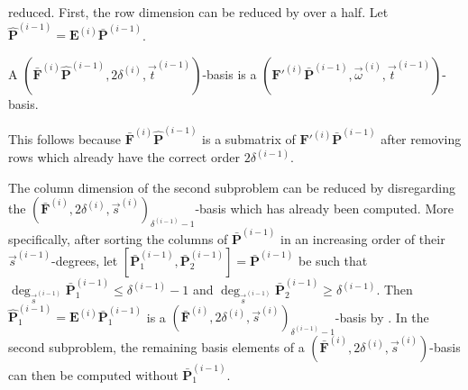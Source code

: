 reduced. First, the row dimension can be reduced by over a half. Let
$\hat{\mathbf{P}}^{\left(i-1\right)}=\mathbf{E}^{\left(i\right)}\bar{\mathbf{P}}^{\left(i-1\right)}$. 
\begin{lem}
\label{lem:simplifySecondSubproblem}A $(\bar{\mathbf{F}}^{\left(i\right)}\hat{\mathbf{P}}^{\left(i-1\right)},2\delta^{\left(i\right)},\vec{t}^{\left(i-1\right)})$-basis
is a $(\mathbf{F}'^{\left(i\right)}\bar{\mathbf{P}}^{\left(i-1\right)},\vec{\omega}^{\left(i\right)},\vec{t}^{\left(i-1\right)})$-basis.\end{lem}
\begin{pf}
This follows because 
$\bar{\mathbf{F}}^{\left(i\right)}\hat{\mathbf{P}}^{\left(i-1\right)}$
is a submatrix of 
$\mathbf{F}'^{\left(i\right)}\bar{\mathbf{P}}^{\left(i-1\right)}$
after removing rows which already have the correct order 
$2\delta^{\left(i-1\right)}$. 
\end{pf}
The column dimension of the second subproblem can be reduced by disregarding
the $(\bar{\mathbf{F}}^{\left(i\right)},2\delta^{\left(i\right)},\vec{s}^{\left(i\right)})_{\delta^{\left(i-1\right)}-1}$-basis
which has already been computed. More specifically, after sorting the columns of
$\bar{\mathbf{P}}^{\left(i-1\right)}$ in an increasing order of their
$\vec{s}^{\left(i-1\right)}$-degrees, let $[\bar{\mathbf{P}}_{1}^{\left(i-1\right)},\bar{\mathbf{P}}_{2}^{\left(i-1\right)}]=\bar{\mathbf{P}}^{\left(i-1\right)}$
be such that $\deg_{\vec{s}^{\left(i-1\right)}}\bar{\mathbf{P}}_{1}^{\left(i-1\right)}\le\delta^{\left(i-1\right)}-1$
and $\deg_{\vec{s}^{\left(i-1\right)}}\bar{\mathbf{P}}_{2}^{\left(i-1\right)}\ge\delta^{\left(i-1\right)}$.
Then $\hat{\mathbf{P}}_{1}^{\left(i-1\right)}=\mathbf{E}^{\left(i\right)}\bar{\mathbf{P}}_{1}^{\left(i-1\right)}$
is a $(\bar{\mathbf{F}}^{\left(i\right)},2\delta^{\left(i\right)},\vec{s}^{\left(i\right)})_{\delta^{\left(i-1\right)}-1}$-basis
by . In the second subproblem,
the remaining basis elements of a $(\bar{\mathbf{F}}^{\left(i\right)},2\delta^{\left(i\right)},\vec{s}^{\left(i\right)})$-basis
can then be computed without $\bar{\mathbf{P}}_{1}^{\left(i-1\right)}$.

